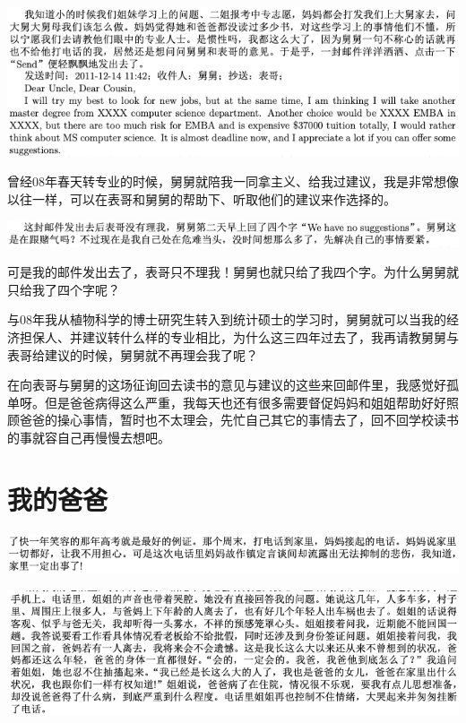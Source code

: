 \documentclass[9pt, b5paper]{article}
\begin{document}
\begin{center}
\includegraphics[width=.9\linewidth]{./pic/backups_plans_20210414_161113.png}
\end{center}

曾经08年春天转专业的时候，舅舅就陪我一同拿主义、给我过建议，我是非常想像以往一样，可以在表哥和舅舅的帮助下、听取他们的建议来作选择的。

\begin{center}
\includegraphics[width=.9\linewidth]{./pic/backups_plans_20210414_161140.png}
\end{center}

可是我的邮件发出去了，表哥只不理我！舅舅也就只给了我四个字。为什么舅舅就只给我了四个字呢？

与08年我从植物科学的博士研究生转入到统计硕士的学习时，舅舅就可以当我的经济担保人、并建议转什么样的专业相比，为什么这三四年过去了，我再请教舅舅与表哥给建议的时候，舅舅就不再理会我了呢？

在向表哥与舅舅的这场征询回去读书的意见与建议的这些来回邮件里，我感觉好孤单呀。但是爸爸病得这么严重，我每天也还有很多需要督促妈妈和姐姐帮助好好照顾爸爸的操心事情，暂时也不太理会，先忙自己其它的事情去了，回不回学校读书的事就容自己再慢慢去想吧。

\section{我的爸爸}
\label{sec:org9c606ef}

\begin{center}
\includegraphics[width=.9\linewidth]{./pic/backups_plans_20210416_155038.png}
\end{center}

\begin{center}
\includegraphics[width=.9\linewidth]{./pic/backups_plans_20210416_155131.png}
\end{center}
\end{document}

